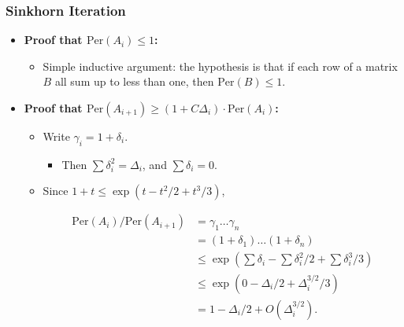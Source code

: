 \documentclass[handout,usenames,dvipsnames,12pt]{beamer}
\begin{document}
\begin{frame}
    \frametitle{Sinkhorn Iteration}

    \begin{itemize}
        \item {\bf Proof that $\text{Per}(A_i) \leq 1$:}
        \begin{itemize}
            \pause
            \item Simple inductive argument: the hypothesis is that if each row of a matrix $B$ all sum up to less than one, then $\text{Per}(B) \leq 1$.
        \end{itemize}

        \pause
        \item {\bf Proof that $\text{Per}(A_{i+1}) \geq (1 + C \Delta_i) \cdot \text{Per}(A_i)$:}
        \begin{itemize}
            \pause
            \item Write $\gamma_i = 1 + \delta_i$.

            \begin{itemize}
                \pause
                \item Then $\sum \delta_i^2 = \Delta_i$, and $\sum \delta_i = 0$.
            \end{itemize}

            \pause
            \item Since $1 + t \leq \exp(t - t^2/2 + t^3/3)$,

            \vspace{-2em}
            \begin{align*}
                \text{Per}(A_i) / \text{Per}(A_{i+1}) &= \gamma_1 \dots \gamma_n \\
                &= (1 + \delta_1) \dots (1 + \delta_n)\\
                &\leq \exp \left(\sum \delta_i - \sum \delta_i^2/2 + \sum \delta_i^3/3 \right)\\
                &\leq \exp(0 - \Delta_i/2 + \Delta_i^{3/2}/3)\\
                &= 1 - \Delta_i / 2 + O(\Delta_i^{3/2}).
            \end{align*}
        \end{itemize}
    \end{itemize}
\end{frame}
\end{document}
